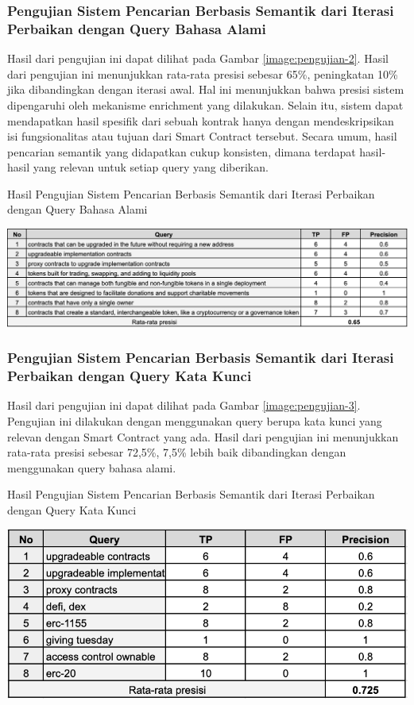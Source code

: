 \subsubsection{Pengujian Sistem Pencarian Berbasis Semantik dari Iterasi Perbaikan dengan Query Bahasa Alami}

Hasil dari pengujian ini dapat dilihat pada Gambar \ref{image:pengujian-2}. Hasil dari pengujian ini menunjukkan rata-rata presisi sebesar 65\%, peningkatan 10\% jika dibandingkan dengan iterasi awal. Hal ini menunjukkan bahwa presisi sistem dipengaruhi oleh mekanisme enrichment yang dilakukan. Selain itu, sistem dapat mendapatkan hasil spesifik dari sebuah kontrak hanya dengan mendeskripsikan isi fungsionalitas atau tujuan dari Smart Contract tersebut. Secara umum, hasil pencarian semantik yang didapatkan cukup konsisten, dimana terdapat hasil-hasil yang relevan untuk setiap query yang diberikan.

\begin{table}[ht]
	\centering
	\caption{Hasil Pengujian Sistem Pencarian Berbasis Semantik dari Iterasi Perbaikan dengan Query Bahasa Alami}
	\includegraphics[width=1\textwidth]{resources/chapter-4/data-1-2.png}
	\label{image:pengujian-2}
\end{table}

\subsubsection{Pengujian Sistem Pencarian Berbasis Semantik dari Iterasi Perbaikan dengan Query Kata Kunci}

Hasil dari pengujian ini dapat dilihat pada Gambar \ref{image:pengujian-3}. Pengujian ini dilakukan dengan menggunakan query berupa kata kunci yang relevan dengan Smart Contract yang ada. Hasil dari pengujian ini menunjukkan rata-rata presisi sebesar 72,5\%, 7,5\% lebih baik dibandingkan dengan menggunakan query bahasa alami.

\begin{table}[ht]
	\centering
	\caption{Hasil Pengujian Sistem Pencarian Berbasis Semantik dari Iterasi Perbaikan dengan Query Kata Kunci}
	\includegraphics[width=1\textwidth]{resources/chapter-4/data-1-3.png}
	\label{image:pengujian-3}
\end{table}

